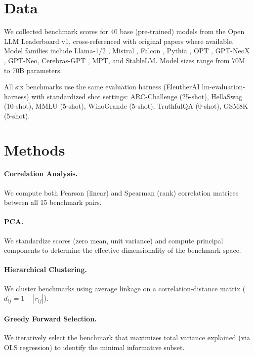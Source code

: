 \documentclass[11pt,a4paper]{article}
\begin{document}
\section{Data}

We collected benchmark scores for 40 base (pre-trained) models from the Open LLM Leaderboard v1, cross-referenced with original papers where available. Model families include Llama-1/2 \citep{touvron2023llama,touvron2023llama2}, Mistral \citep{jiang2023mistral}, Falcon \citep{falcon}, Pythia \citep{biderman2023pythia}, OPT \citep{zhang2022opt}, GPT-NeoX \citep{black2022gptneox}, GPT-Neo, Cerebras-GPT \citep{dey2023cerebrasgpt}, MPT, and StableLM. Model sizes range from 70M to 70B parameters.

All six benchmarks use the same evaluation harness (EleutherAI lm-evaluation-harness) with standardized shot settings: ARC-Challenge (25-shot), HellaSwag (10-shot), MMLU (5-shot), WinoGrande (5-shot), TruthfulQA (0-shot), GSM8K (5-shot).

\section{Methods}

\paragraph{Correlation Analysis.} We compute both Pearson (linear) and Spearman (rank) correlation matrices between all 15 benchmark pairs.

\paragraph{PCA.} We standardize scores (zero mean, unit variance) and compute principal components to determine the effective dimensionality of the benchmark space.

\paragraph{Hierarchical Clustering.} We cluster benchmarks using average linkage on a correlation-distance matrix ($d_{ij} = 1 - |r_{ij}|$).

\paragraph{Greedy Forward Selection.} We iteratively select the benchmark that maximizes total variance explained (via OLS regression) to identify the minimal informative subset.
\end{document}
